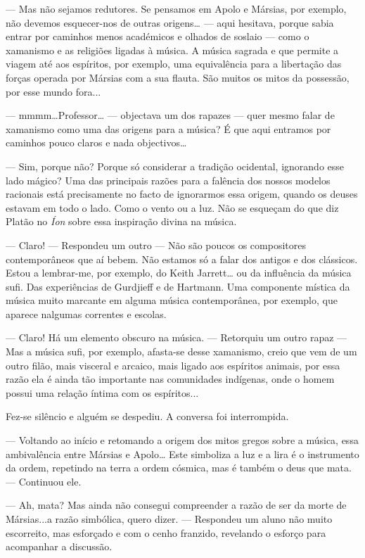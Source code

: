 --- Mas não sejamos redutores. Se pensamos em Apolo e Mársias, por
exemplo, não devemos esquecer-nos de outras origens\ldots{} --- aqui
hesitava, porque sabia entrar por caminhos menos académicos e olhados de
soslaio --- como o xamanismo e as religiões ligadas à música. A música
sagrada e que permite a viagem até aos espíritos, por exemplo, uma
equivalência para a libertação das forças operada por Mársias com a sua
flauta. São muitos os mitos da possessão, por esse mundo fora...

--- mmmm\ldots{}Professor\ldots{} --- objectava um dos rapazes --- quer mesmo
falar de xamanismo como uma das origens para a música? É que aqui
entramos por caminhos pouco claros e nada objectivos\ldots{}

--- Sim, porque não? Porque só considerar a tradição ocidental, ignorando
esse lado mágico? Uma das principais razões para a falência dos nossos
modelos racionais está precisamente no facto de ignorarmos essa origem,
quando os deuses estavam em todo o lado. Como o vento ou a luz. Não se
esqueçam do que diz Platão no \emph{Íon }sobre essa inspiração divina na
música.

--- Claro! --- Respondeu um outro --- Não são poucos os compositores
contemporâneos que aí bebem. Não estamos só a falar dos antigos e dos
clássicos. Estou a lembrar-me, por exemplo, do Keith Jarrett\ldots{} ou
da influência da música sufi. Das experiências de Gurdjieff e de
Hartmann. Uma componente mística da música muito marcante em alguma
música contemporânea, por exemplo, que aparece nalgumas correntes e
escolas.

--- Claro! Há um elemento obscuro na música. --- Retorquiu um outro rapaz ---
Mas a música sufi, por exemplo, afasta-se desse xamanismo, creio que vem
de um outro filão, mais visceral e arcaico, mais ligado aos espíritos
animais, por essa razão ela é ainda tão importante nas comunidades
indígenas, onde o homem possui uma relação íntima com os espíritos...

Fez-se silêncio e alguém se despediu. A conversa foi interrompida.

--- Voltando ao início e retomando a origem dos mitos gregos sobre a
música, essa ambivalência entre Mársias e Apolo\ldots{} Este simboliza a
luz e a lira é o instrumento da ordem, repetindo na terra a ordem
cósmica, mas é também o deus que mata. --- Continuou ele.

--- Ah, mata? Mas ainda não consegui compreender a razão de ser da morte
de Mársias...a razão simbólica, quero dizer. --- Respondeu um aluno não
muito escorreito, mas esforçado e com o cenho franzido, revelando o
esforço para acompanhar a discussão.

